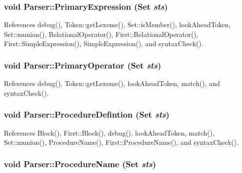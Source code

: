 \hypertarget{classParser_abe6f497eafd870c3e9f28d4c241e280a}{
\subsubsection[{PrimaryExpression}]{\setlength{\rightskip}{0pt plus 5cm}void Parser::PrimaryExpression ({\bf Set} {\em sts})}}
\label{classParser_abe6f497eafd870c3e9f28d4c241e280a}


References debug(), Token::getLexeme(), Set::isMember(), lookAheadToken, Set::munion(), RelationalOperator(), First::RelationalOperator(), First::SimpleExpression(), SimpleExpression(), and syntaxCheck().

\hypertarget{classParser_a7ac200c2e0ac927e115027fb593ac72d}{
\subsubsection[{PrimaryOperator}]{\setlength{\rightskip}{0pt plus 5cm}void Parser::PrimaryOperator ({\bf Set} {\em sts})}}
\label{classParser_a7ac200c2e0ac927e115027fb593ac72d}


References debug(), Token::getLexeme(), lookAheadToken, match(), and syntaxCheck().

\hypertarget{classParser_a0f04e446170cd685f2ab8ecb6782025f}{
\subsubsection[{ProcedureDefintion}]{\setlength{\rightskip}{0pt plus 5cm}void Parser::ProcedureDefintion ({\bf Set} {\em sts})}}
\label{classParser_a0f04e446170cd685f2ab8ecb6782025f}


References Block(), First::Block(), debug(), lookAheadToken, match(), Set::munion(), ProcedureName(), First::ProcedureName(), and syntaxCheck().

\hypertarget{classParser_a72cc285af2d83a0348a47a78aced1582}{
\subsubsection[{ProcedureName}]{\setlength{\rightskip}{0pt plus 5cm}void Parser::ProcedureName ({\bf Set} {\em sts})}}
\label{classParser_a72cc285af2d83a0348a47a78aced1582}


